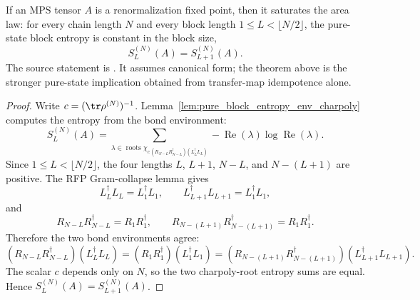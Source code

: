 \begin{theorem}
    \label{thm:rfp-saturates-area-law}
    \leanok
    If an MPS tensor $A$ is a renormalization fixed point, then it saturates the
    area law: for every chain length $N$ and every block length
    $1\le L<\lfloor N/2\rfloor$, the pure-state block entropy is constant in the
    block size,
    \[
        S_L^{(N)}(A) = S_{L+1}^{(N)}(A).
    \]
    The source statement is
    \cite[Proposition~3.14, lines~606--608]{Cirac2016MPDO_arXiv}.
    It assumes canonical form; the theorem above is the stronger pure-state
    implication obtained from transfer-map idempotence alone.
\end{theorem}
\begin{proof}\leanok
    Write $c=(\tr\rho^{(N)})^{-1}$. Lemma~\ref{lem:pure_block_entropy_env_charpoly}
    computes the entropy from the bond environment:
    \[
        S_L^{(N)}(A)
        =
        \sum_{\lambda\in
            \operatorname{roots}\chi_{c\,(R_{N-L}R_{N-L}^\dagger)
                (L_L^\dagger L_L)}}
            -\operatorname{Re}(\lambda)\log\operatorname{Re}(\lambda).
    \]
    Since $1\le L<\lfloor N/2\rfloor$, the four lengths
    $L$, $L+1$, $N-L$, and $N-(L+1)$ are positive. The RFP Gram-collapse lemma
    gives
    \[
        L_L^\dagger L_L=L_1^\dagger L_1,\qquad
        L_{L+1}^\dagger L_{L+1}=L_1^\dagger L_1,
    \]
    and
    \[
        R_{N-L}R_{N-L}^\dagger=R_1R_1^\dagger,\qquad
        R_{N-(L+1)}R_{N-(L+1)}^\dagger=R_1R_1^\dagger .
    \]
    Therefore the two bond environments agree:
    \[
        (R_{N-L}R_{N-L}^\dagger)(L_L^\dagger L_L)
        =
        (R_1R_1^\dagger)(L_1^\dagger L_1)
        =
        (R_{N-(L+1)}R_{N-(L+1)}^\dagger)
            (L_{L+1}^\dagger L_{L+1}).
    \]
    The scalar $c$ depends only on $N$, so the two charpoly-root entropy sums
    are equal. Hence $S_L^{(N)}(A)=S_{L+1}^{(N)}(A)$.
\end{proof}


